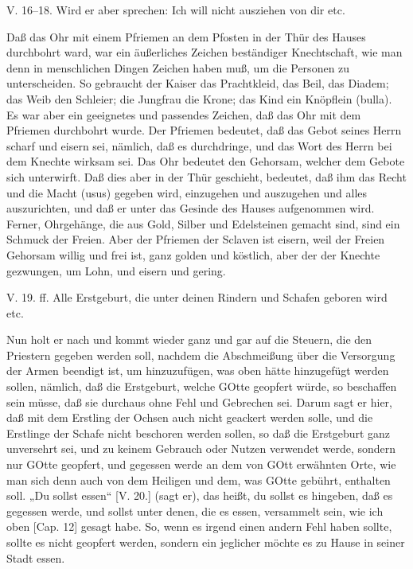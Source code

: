 \begin{schriftzitat}
V. 16–18. Wird er aber sprechen: Ich will nicht ausziehen von dir etc.
\end{schriftzitat}

Daß das Ohr mit einem Pfriemen an dem Pfosten in der Thür des Hauses durchbohrt ward, war ein äußerliches Zeichen beständiger Knechtschaft, wie man denn in menschlichen Dingen Zeichen haben muß, um die Personen zu unterscheiden. So gebraucht der Kaiser das Prachtkleid, das Beil, das Diadem; das Weib den Schleier; die Jungfrau die Krone; das Kind ein Knöpflein (bulla). Es war aber ein geeignetes und passendes Zeichen, daß das Ohr mit dem Pfriemen durchbohrt wurde. Der Pfriemen bedeutet, daß das Gebot seines Herrn scharf und eisern sei, nämlich, daß es durchdringe, und das Wort des Herrn bei dem Knechte wirksam sei. Das Ohr bedeutet den Gehorsam, welcher dem Gebote sich unterwirft. Daß dies aber in der Thür geschieht, bedeutet, daß ihm das Recht und die Macht (usus) gegeben wird, einzugehen und auszugehen und alles auszurichten, und daß er unter das Gesinde des Hauses aufgenommen wird. Ferner, Ohrgehänge, die aus Gold, Silber und Edelsteinen
gemacht sind, sind ein Schmuck der Freien. Aber der Pfriemen der Sclaven ist eisern, weil der Freien Gehorsam willig und frei ist, ganz golden und köstlich, aber der der Knechte gezwungen, um Lohn, und eisern und gering.

\begin{schriftzitat}
V. 19. ff. Alle Erstgeburt, die unter deinen Rindern und Schafen geboren wird etc.
\end{schriftzitat}

Nun holt er nach und kommt wieder ganz und gar auf die Steuern, die den Priestern gegeben werden soll, nachdem die Abschmeißung über die Versorgung der Armen beendigt ist, um hinzuzufügen, was oben hätte hinzugefügt werden sollen, nämlich, daß die Erstgeburt, welche GOtte geopfert würde, so beschaffen sein müsse, daß sie durchaus ohne Fehl und Gebrechen sei. Darum sagt er hier, daß mit dem Erstling der Ochsen auch nicht geackert werden solle, und die Erstlinge der Schafe nicht beschoren werden sollen, so daß die Erstgeburt ganz unversehrt sei, und zu keinem Gebrauch oder Nutzen verwendet werde, sondern nur GOtte geopfert, und gegessen werde an dem von GOtt erwähnten Orte, wie man sich denn auch von dem Heiligen und dem, was GOtte gebührt, enthalten soll. „Du sollst essen“ [V. 20.] (sagt er), das heißt, du sollst es hingeben, daß es gegessen werde, und sollst unter denen, die es essen, versammelt sein, wie ich oben [Cap. 12] gesagt habe. So, wenn es irgend einen andern Fehl haben sollte, sollte es nicht geopfert werden, sondern ein jeglicher möchte es zu Hause in seiner Stadt essen.

